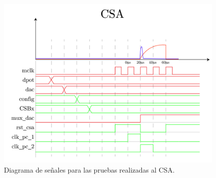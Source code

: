 \begin{figure}[!t]
	\centering
	\includegraphics[width=1\textwidth]{./figures/theorical/tiempos_csa.png}
	\caption{Diagrama de señales para las pruebas realizadas al CSA.}\label{fig:diagramacsa}
\end{figure}



